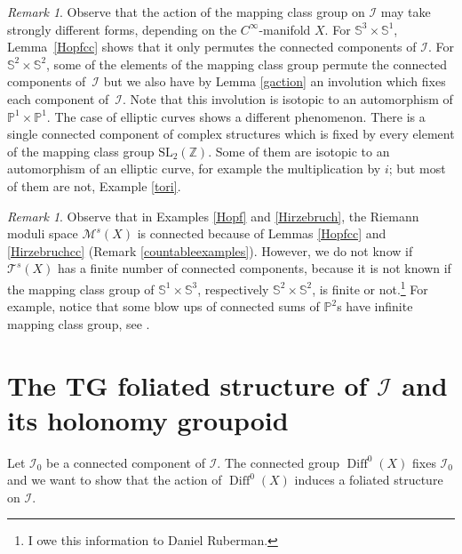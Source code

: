 \documentclass[10pt]{amsart}
\let\mathcal\mathscr
\newcommand{\SL}{\mathrm{SL}}
\DeclareMathOperator{\Diff}{Diff}
\theoremstyle{plain}
\theoremstyle{definition}
\theoremstyle{remark}
\newtheorem{remark}[theorem]{Remark}
\numberwithin{equation}{section}
\newcommand{\D}{\Diff^0(X)}
\newcommand{\cI}{\mathcal{I}}
\begin{document}
\begin{remark}
\label{ell}
Observe that the action of the mapping class group on $\cI$ may take strongly different forms, depending on the $C^\infty$-manifold $X$. For $\mathbb S^3\times\mathbb S^1$, Lemma~\ref{Hopfcc} shows that it only permutes the connected components of $\cI$. For $\mathbb S^2\times \mathbb S^2$, some of the elements of the mapping class group permute the connected components of~$\cI$ but we also have by Lemma \ref{gaction} an involution which fixes each component of~$\cI$. Note that this involution is isotopic to an automorphism of $\mathbb P^1\times\mathbb P^1$. The case of elliptic curves shows a different phenomenon. There is a single connected component of complex structures which is fixed by every element of the mapping class group $\SL_2(\mathbb Z)$. Some of them are isotopic to an automorphism of an elliptic curve, for example the multiplication by $i$; but most of them are not, \cf Example \ref{tori}.
\end{remark}

\begin{remark}
\label{CC2}
Observe that in Examples \ref{Hopf} and \ref{Hirzebruch}, the Riemann moduli space $\mathcal M^s(X)$ is connected because of Lemmas \ref{Hopfcc} and \ref{Hirzebruchcc} (\cf Remark \ref{countableexamples}). However, we do not know if $\mathcal T^s(X)$ has a finite number of connected components, because it is not known if the mapping class group of $\mathbb S^1\times\mathbb S^3$, respectively $\mathbb S^2\times\mathbb S^2$, is finite or not.\footnote{I owe this information to Daniel Ruberman.} For example, notice that some blow ups of connected sums of $\mathbb P^2$s have infinite mapping class group, see \cite{Ruber}.
\end{remark}

\section{The TG foliated structure of \texorpdfstring{$\cI$}{I} and its holonomy groupoid}
\label{TGfoliationsection}
Let $\cI_0$ be a connected component of $\cI$. The connected group $\D$ fixes $\cI_0$ and we want to show that the action of $\D$ induces a foliated structure on $\cI$.
\end{document}
